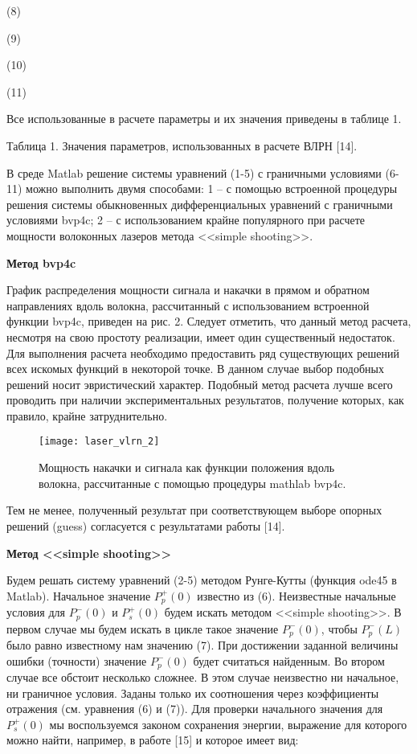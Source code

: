 (8)

(9)

(10)

(11)

Все использованные в расчете параметры и их значения приведены в таблице 1.

Таблица 1. Значения параметров, использованных в расчете ВЛРН [14].

В среде Matlab решение системы уравнений (1-5) с граничными условиями (6-11) можно выполнить двумя способами: 1 – с помощью встроенной процедуры решения системы обыкновенных дифференциальных уравнений с граничными условиями bvp4c; 2 – с использованием крайне популярного при расчете мощности волоконных лазеров метода <<simple shooting>>.

\textbf{Метод bvp4c}

График распределения мощности сигнала и накачки в прямом и обратном направлениях вдоль волокна, рассчитанный с использованием встроенной функции bvp4c, приведен на рис. 2. Следует отметить, что данный метод расчета, несмотря на свою простоту реализации, имеет один существенный недостаток. Для выполнения расчета необходимо предоставить ряд существующих решений всех искомых функций в некоторой точке. В данном случае выбор подобных решений носит эвристический характер. Подобный метод расчета лучше всего проводить при наличии экспериментальных результатов, получение которых, как правило, крайне затруднительно.

\begin{figure}[ht]
  \centering
  \texttt{[image: laser\_vlrn\_2]}
  \caption{Мощность накачки и сигнала как функции положения вдоль волокна, рассчитанные с помощью процедуры mathlab bvp4c.}
  \label{img:laser_vlrn_2}
\end{figure}

Тем не менее, полученный результат при соответствующем выборе опорных решений (guess) согласуется с результатами работы [14].

\textbf{Метод <<simple shooting>>}

Будем решать систему уравнений (2-5) методом Рунге-Кутты (функция ode45 в Matlab). Начальное значение $P_p^{+}(0)$ известно из (6). Неизвестные начальные условия для $P_p^{-}(0)$ и $P_s^{+}(0)$ будем искать методом <<simple shooting>>. В первом случае мы будем искать в цикле такое значение $P_p^{-}(0)$, чтобы $P_p^{-}(L)$ было равно известному нам значению (7). При достижении заданной величины ошибки (точности) значение $P_p^{-}(0)$ будет считаться найденным. Во втором случае все обстоит несколько сложнее. В этом случае неизвестно ни начальное, ни граничное условия. Заданы только их соотношения через коэффициенты отражения (см. уравнения (6) и (7)). Для проверки начального значения для $P_s^{+}(0)$ мы воспользуемся законом сохранения энергии, выражение для которого можно найти, например, в работе [15] и которое имеет вид:

